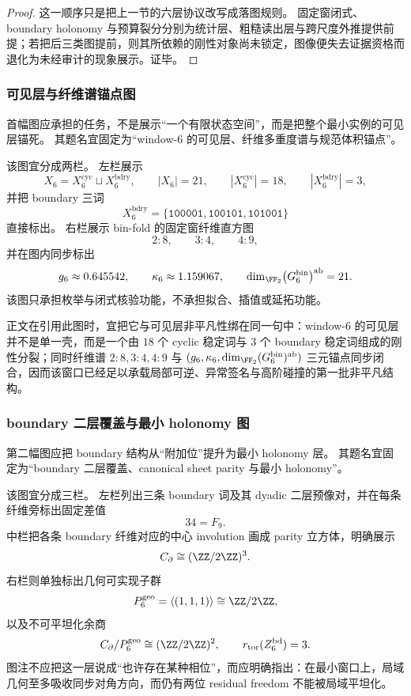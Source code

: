 \begin{proof}
这一顺序只是把上一节的六层协议改写成落图规则。
固定窗闭式、boundary holonomy 与预算裂分分别为统计层、粗糙读出层与跨尺度外推提供前提；若把后三类图提前，则其所依赖的刚性对象尚未锁定，图像便失去证据资格而退化为未经审计的现象展示。证毕。
\end{proof}

\subsubsection{可见层与纤维谱锚点图}\label{subsubsec:typed-address-biaxial-completion-window6-figure-visible-spectrum-anchor}
首幅图应承担的任务，不是展示“一个有限状态空间”，而是把整个最小实例的可见层锚死。
其题名宜固定为“window-\(6\) 的可见层、纤维多重度谱与规范体积锚点”。

该图宜分成两栏。
左栏展示
\[
X_6=X_6^{\mathrm{cyc}}\sqcup X_6^{\mathrm{bdry}},
\qquad
|X_6|=21,
\qquad
|X_6^{\mathrm{cyc}}|=18,
\qquad
|X_6^{\mathrm{bdry}}|=3,
\]
并把 boundary 三词
\[
X_6^{\mathrm{bdry}}
=
\{\texttt{100001},\texttt{100101},\texttt{101001}\}
\]
直接标出。
右栏展示 bin-fold 的固定窗纤维直方图
\[
2{:}8,
\qquad
3{:}4,
\qquad
4{:}9,
\]
并在图内同步标出
\[
g_6\approx 0.645542,
\qquad
\kappa_6\approx 1.159067,
\qquad
\dim_{\FF_2}\bigl(G_6^{\mathrm{bin}}\bigr)^{\mathrm{ab}}=21.
\]
该图只承担枚举与闭式核验功能，不承担拟合、插值或延拓功能。

正文在引用此图时，宜把它与可见层非平凡性绑在同一句中：window-\(6\) 的可见层并不是单一壳，而是一个由 \(18\) 个 cyclic 稳定词与 \(3\) 个 boundary 稳定词组成的刚性分裂；同时纤维谱 \(2{:}8,3{:}4,4{:}9\) 与 \((g_6,\kappa_6,\dim_{\FF_2}(G_6^{\mathrm{bin}})^{\mathrm{ab}})\) 三元锚点同步闭合，因而该窗口已经足以承载局部可逆、异常签名与高阶碰撞的第一批非平凡结构。

\subsubsection{boundary 二层覆盖与最小 holonomy 图}\label{subsubsec:typed-address-biaxial-completion-window6-figure-boundary-holonomy}
第二幅图应把 boundary 结构从“附加位”提升为最小 holonomy 层。
其题名宜固定为“boundary 二层覆盖、canonical sheet parity 与最小 holonomy”。

该图宜分成三栏。
左栏列出三条 boundary 词及其 dyadic 二层预像对，并在每条纤维旁标出固定差值
\[
34=F_9.
\]
中栏把各条 boundary 纤维对应的中心 involution 画成 parity 立方体，明确展示
\[
C_{\partial}\cong (\ZZ/2\ZZ)^3.
\]
右栏则单独标出几何可实现子群
\[
P_6^{\mathrm{geo}}=\langle(1,1,1)\rangle\cong \ZZ/2\ZZ,
\]
以及不可平坦化余商
\[
C_{\partial}/P_6^{\mathrm{geo}}\cong (\ZZ/2\ZZ)^2,
\qquad
r_{\mathrm{tor}}(Z_6^{\mathrm{bd}})=3.
\]
图注不应把这一层说成“也许存在某种相位”，而应明确指出：在最小窗口上，局域几何至多吸收同步对角方向，而仍有两位 residual freedom 不能被局域平坦化。

